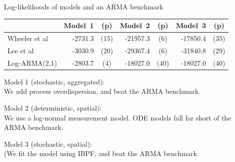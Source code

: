 \documentclass{beamer}
\begin{document}
\begin{frame}{Log-likelihoods of models and an ARMA benchmark}

  \begin{center}
\begin{tabular}{|l|rc|rc|rc|}
\hline
& Model~1& (p) & Model~2 & (p) & Model~3 & (p)
\\
\hline
Wheeler et al
& { -2731.3} & (15)
& -21957.3 & (6)
& { -17850.4} & (35)
\\
Lee et al
& -3030.9 & (20)
& -29367.4 & (6)
& -31840.8 & (29)
\\
Log-ARMA(2,1)
& -2803.7 & (4)  %
& { -18027.0} & (40)  %
& -18027.0 & (40)
\\
\hline
\end{tabular}
  \end{center}

  \vspace{3mm}
  
  Model 1 (stochastic, aggregated): \\
  We add process overdispersion, and beat the ARMA benchmark.

  \vspace{5mm}

  Model 2 (deterministic, spatial): \\
  We use a log-normal measurement model. ODE models fall far short of the ARMA benchmark.

    \vspace{5mm}

    Model 3 (stochastic, spatial): \\
    (We fit the model using IBPF, and beat the ARMA benchmark.
  
\end{frame}
\end{document}
